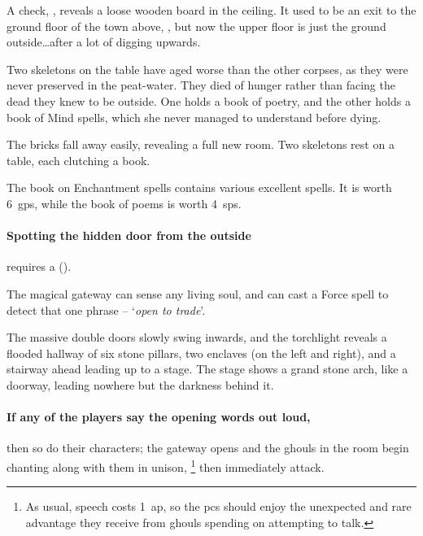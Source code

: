 A  check, \tn[10], reveals a loose wooden board in the ceiling.
It used to be an exit to the ground floor of the town above, , but now the upper floor is just the ground outside\ldots after a lot of digging upwards.


  Two skeletons on the table have aged worse than the other corpses, as they were never preserved in the peat-water.
  They died of hunger rather than facing the dead they knew to be outside.
  One holds a book of poetry, and the other holds a book of Mind spells, which she never managed to understand before dying.

\begin{boxtext}
  The bricks fall away easily, revealing a full new room.  Two skeletons rest on a table, each clutching a book.
\end{boxtext}

The book on Enchantment spells contains various excellent spells.
It is worth 6~\glspl{gp}, while the book of poems is worth 4~\glspl{sp}.

\paragraph{Spotting the hidden door from the outside}
requires a  (\tn[12]).



The magical gateway can sense any living soul, and can cast a Force spell to detect that one phrase -- `\textit{open to trade}'.

\begin{boxtext}
  The massive double doors slowly swing inwards, and the torchlight reveals a flooded hallway of six stone pillars, two enclaves (on the left and right), and a stairway ahead leading up to a stage.
  The stage shows a grand stone arch, like a doorway, leading nowhere but the darkness behind it.
\end{boxtext}

\paragraph{If any of the players say the opening words out loud,}
then so do their characters; the gateway opens and the ghouls in the room begin chanting along with them in unison,%
\footnote{As usual, speech costs 1~\gls{ap}, so the \glspl{pc} should enjoy the unexpected and rare advantage they receive from ghouls spending  on attempting to talk.}
then immediately attack.

